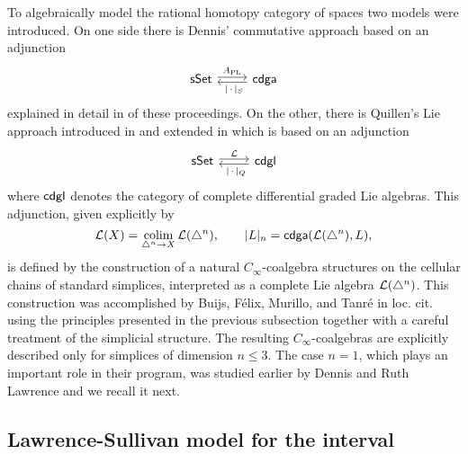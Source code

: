 To algebraically model the rational homotopy category of spaces two models were introduced.
On one side there is Dennis' commutative approach \cite{sullivan1977infinitesimal} based on an adjunction
\[
\begin{tikzcd}
\sSet \arrow[r, shift left=2pt, "A_{\mathrm{PL}}"] &
\cdga \arrow[l, shift left=2pt, "\ \bars{\,\cdot\,}_S"]
\end{tikzcd}
\]
explained in detail in \cite{bibid} of these proceedings.
On the other, there is Quillen's Lie approach introduced in \cite{quillen1969rational} and extended in \cite{buijs2013algebraicmodels, buijs2020liemodels} which is based on an adjunction
\[
\begin{tikzcd}
\sSet \arrow[r, shift left=2pt, "\cL"] &
\cdgl \arrow[l, shift left=2pt, "\ \bars{\,\cdot\,}_Q"]
\end{tikzcd}
\]
where $\mathsf{cdgl}$ denotes the category of complete differential graded Lie algebras.
This adjunction, given explicitly by
\[
\mathcal{L}(X) = \operatorname*{colim}_{\triangle^n \to X} \mathcal{L}(\triangle^n), \qquad
\lvert L\rvert_n = \mathsf{cdga}(\mathcal{L}(\triangle^n), L),
\]
is defined by the construction of a natural $C_\infty$-coalgebra structures on the cellular chains of standard simplices, interpreted as a complete Lie algebra $\mathcal{L}(\triangle^n)$.
This construction was accomplished by Buijs, F{\'e}lix, Murillo, and Tanr{\'e} in loc. cit. using the principles presented in the previous subsection together with a careful treatment of the simplicial structure.
The resulting $C_\infty$-coalgebras are explicitly described only for simplices of dimension $n \leq 3$.
The case $n = 1$, which plays an important role in their program, was studied earlier by Dennis and Ruth Lawrence \cite{lawrence2014interval} and we recall it next.

\subsection{Lawrence-Sullivan model for the interval}

